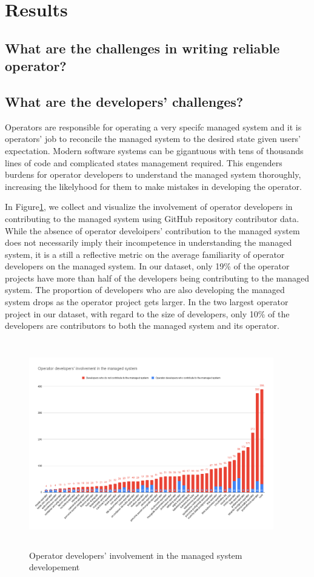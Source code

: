 \section{Results}
\label{sec:result}
\subsection{What are the challenges in writing reliable operator?}
\subsection{What are the developers' challenges?}
Operators are responsible for operating a very specifc managed system and it is
operators' job to reconcile the managed system to the desired state given
users' expectation. Modern software systems can be gigantuous with tens of
thousands lines of code and complicated states management required. This
engenders burdens for operator developers to understand the managed system
thoroughly, increasing the likelyhood for them to make mistakes in developing
the operator.

In Figure\ref{fig:contributor}, we collect and visualize the involvement of
operator developers in contributing to the managed system using GitHub
repository contributor data. While the absence of operator develoipers'
contribution to the managed system does not necessarily imply their
incompetence in understanding the managed system, it is a still a reflective
metric on the average familiarity of operator developers on the managed system.
In our dataset, only 19\% of the operator projects have more than half of the
developers being contributing to the managed system. The proportion of
developers who are also developing the managed system drops as the operator
project gets larger. In the two largest operator project in our dataset, with
regard to the size of developers, only 10\% of the developers are contributors
to both the managed system and its operator.

\begin{figure}
    \centering
    \includegraphics[width=0.95\textwidth,height=9cm]{figures/operator-contributor-involvement-breakdown.png}
    \caption{Operator developers' involvement in the managed system developement}
    \label{fig:contributor}
\end{figure}

